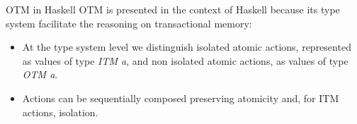 \documentclass[beamer={noamsthm,10pt},target=bach]{thud}[2014/03/11]
\begin{document}
\begin{frame}{OTM in Haskell}
OTM is presented in the context of Haskell because its type system facilitate the reasoning on transactional memory:
\begin{itemize}
\item At the type system level we distinguish isolated atomic actions, represented as values of type \emph{ITM a}, and non isolated atomic actions, as values of type \emph{OTM a}.
\item Actions can be sequentially composed preserving atomicity and, for ITM actions, isolation.
\end{itemize}
\end{frame}

        
        
        
        
        
        

\end{document}
